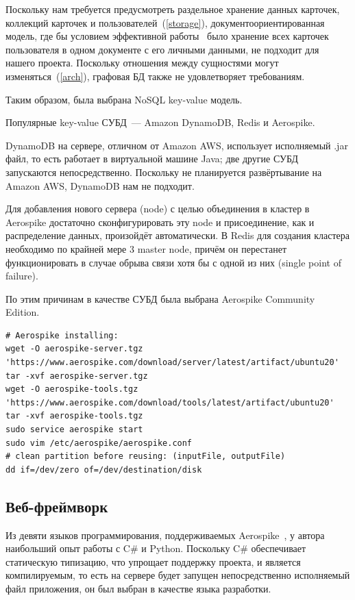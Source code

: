 \documentclass[14pt]{matmex-diploma-custom}
\begin{document}
Поскольку нам требуется предусмотреть раздельное хранение данных карточек, коллекций карточек и пользователей~(\ref{storage}), документоориентированная модель, где бы условием эффективной работы~\cite{article:join} было хранение всех карточек пользователя в одном документе с его личными данными, не подходит для нашего проекта. Поскольку отношения между сущностями могут изменяться~(\ref{arch}), графовая БД также не удовлетворяет требованиям.

Таким образом, была выбрана NoSQL key-value модель.

Популярные key-value СУБД~--- Amazon DynamoDB, Redis и Aerospike.

DynamoDB на сервере, отличном от Amazon AWS, использует исполняемый .jar файл, то есть работает в виртуальной машине Java; две другие СУБД запускаются непосредственно. Поскольку не планируется развёртывание на Amazon AWS, DynamoDB нам не подходит.

Для добавления нового сервера (node) с целью объединения в кластер в Aerospike достаточно сконфигурировать эту node и присоединение, как и распределение данных, произойдёт автоматически. В Redis для создания кластера необходимо по крайней мере 3 master node, причём он перестанет функционировать в случае обрыва связи хотя бы с одной из них (single point of failure).

\sloppy
По этим причинам в качестве СУБД была выбрана Aerospike Community Edition.

\lstset{style=sharpc}
\begin{lstlisting}
# Aerospike installing:
wget -O aerospike-server.tgz 'https://www.aerospike.com/download/server/latest/artifact/ubuntu20'
tar -xvf aerospike-server.tgz
wget -O aerospike-tools.tgz 'https://www.aerospike.com/download/tools/latest/artifact/ubuntu20'
tar -xvf aerospike-tools.tgz
sudo service aerospike start
sudo vim /etc/aerospike/aerospike.conf
# clean partition before reusing: (inputFile, outputFile)
dd if=/dev/zero of=/dev/destination/disk
\end{lstlisting}

\subsection{Веб-фреймворк}
Из девяти языков программирования, поддерживаемых Aerospike~\cite{aero:clients}, у автора наибольший опыт работы с C\# и Python. Поскольку C\# обеспечивает статическую типизацию, что упрощает поддержку проекта, и является компилируемым, то есть на сервере будет запущен непосредственно исполняемый файл приложения, он был выбран в качестве языка разработки.
\end{document}
